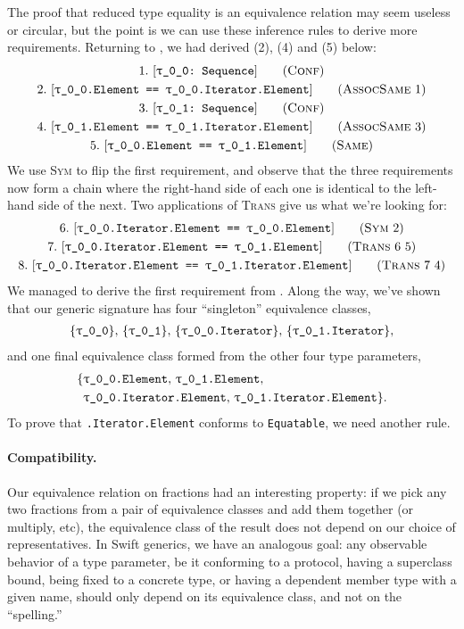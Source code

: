 \documentclass[../generics]{subfiles}
\begin{document}
\begin{example}\label{derived equiv example}
The proof that reduced type equality is an equivalence relation may seem useless or circular, but the point is we can use these inference rules to derive more requirements. Returning to , we had derived (2), (4) and (5) below:
\begin{gather*}
\ConfStep{\rT}{Sequence}{1}\\
\AssocSameStep{1}{\rT.Element}{\rT.Iterator.Element}{2}\\
\ConfStep{\rU}{Sequence}{3}\\
\AssocSameStep{3}{\rU.Element}{\rU.Iterator.Element}{4}\\
\SameStep{\rT.Element}{\rU.Element}{5}
\end{gather*}
We use \textsc{Sym} to flip the first requirement, and observe that the three requirements now form a chain where the right-hand side of each one is identical to the left-hand side of the next. Two applications of \textsc{Trans} give us what we're looking for:
\begin{gather*}
\SymStep{2}{\rT.Iterator.Element}{\rT.Element}{6}\\
\TransStep{6}{5}{\rT.Iterator.Element}{\rU.Element}{7}\\
\TransStep{7}{4}{\rT.Iterator.Element}{\rU.Iterator.Element}{8}
\end{gather*}
We managed to derive the first requirement from . Along the way, we've shown that our generic signature has four ``singleton'' equivalence classes,
\begin{gather*}
\{\texttt{\texttt{$\uptau$\_0\_0}}\},\,
\{\texttt{\texttt{$\uptau$\_0\_1}}\},\,
\{\texttt{\texttt{$\uptau$\_0\_0}.Iterator}\},\,
\{\texttt{\texttt{$\uptau$\_0\_1}.Iterator}\},
\end{gather*}
and one final equivalence class formed from the other four type parameters,
\begin{align*}
\{&\texttt{\texttt{$\uptau$\_0\_0}.Element},\,\texttt{\texttt{$\uptau$\_0\_1}.Element},\,\\
&\texttt{\texttt{$\uptau$\_0\_0}.Iterator.Element},\,\texttt{\texttt{$\uptau$\_0\_1}.Iterator.Element}\}.
\end{align*}
To prove that \texttt{\rT.Iterator.Element} conforms to \texttt{Equatable}, we need another rule.
\end{example}

\paragraph{Compatibility.}
Our equivalence relation on fractions had an interesting property: if we pick any two fractions from a pair of equivalence classes and add them together (or multiply, etc), the equivalence class of the result does not depend on our choice of representatives. In Swift generics, we have an analogous goal: any observable behavior of a type parameter, be it conforming to a protocol, having a superclass bound, being fixed to a concrete type, or having a dependent member type with a given name, should only depend on its equivalence class, and not on the ``spelling.''
\end{document}
